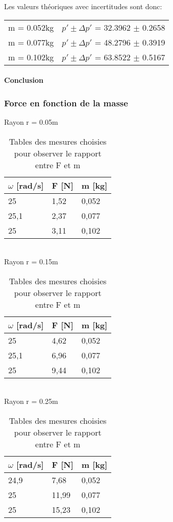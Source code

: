 Les valeurs théoriques avec incertitudes sont donc:

\begin{table}[ht]
    \centering
    \begin{tabular}{l l}
	m = 0.052kg & $p' \pm \Delta p'$ = 32.3962 $\pm$ 0.2658 \\
	m = 0.077kg & $p' \pm \Delta p'$ = 48.2796 $\pm$ 0.3919 \\
	m = 0.102kg & $p' \pm \Delta p'$ = 63.8522 $\pm$ 0.5167 \\
    \end{tabular}
\end{table}

\paragraph{Conclusion}

\newpage
\subsubsection{Force en fonction de la masse}

\begin{table}[ht]
    \centering
    \caption[Tables mesures masse force]{Tables des mesures choisies pour observer le rapport entre F et m}

    Rayon r = 0.05m\\[1px]
    \begin{tabular}{|l|l|l|}
    \hline
	$\omega$ [rad/s] &F [N]	&m [kg]	\\
    \hline
	25	&1,52	&0,052 \\
	25,1	&2,37	&0,077 \\
	25	&3,11	&0,102 \\
    \hline
    \end{tabular}\\[5px]

    Rayon r = 0.15m\\[1px]
    \begin{tabular}{|l|l|l|}
    \hline
	$\omega$ [rad/s] &F [N]	&m [kg]	\\
    \hline
	25	&4,62	&0,052 \\
	25,1	&6,96	&0,077 \\
	25	&9,44	&0,102 \\
    \hline
    \end{tabular}\\[5px]

    Rayon r = 0.25m\\[1px]
    \begin{tabular}{|l|l|l|}
    \hline
	$\omega$ [rad/s] &F [N]	&m [kg]	\\
    \hline
	24,9	&7,68	&0,052 \\
	25	&11,99	&0,077 \\
	25	&15,23	&0,102 \\
    \hline
    \end{tabular}
\end{table}

